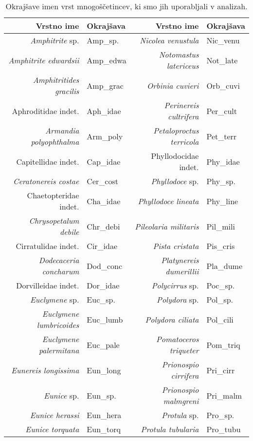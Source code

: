\begin{table}[htb]\footnotesize
\begin{center}
\caption[Okrajšav imen vrst mnogoščetincev]{Okrajšave imen vrst mnogoščetincev, ki smo jih uporabljali v analizah.}
\label{tab:okrasave:poly}
 \begin{tabular}{r l r l}
 \toprule
 Vrstno ime & Okrajšava & Vrstno ime & Okrajšava\\
 \midrule
\emph{Amphitrite} sp. & Amp\_sp. & \emph{Nicolea venustula} & Nic\_venu \\
\emph{Amphitrite edwardsii} & Amp\_edwa & \emph{Notomastus latericeus} & Not\_late \\
\emph{Amphitritides gracilis} & Amp\_grac & \emph{Orbinia cuvieri} & Orb\_cuvi \\
Aphroditidae indet. & Aph\_idae & \emph{Perinereis cultrifera} & Per\_cult \\
\emph{Armandia polyophthalma} & Arm\_poly & \emph{Petaloproctus terricola} & Pet\_terr \\
Capitellidae indet. & Cap\_idae & Phyllodocidae indet. & Phy\_idae \\
\emph{Ceratonereis costae} & Cer\_cost & \emph{Phyllodoce} sp. & Phy\_sp. \\
Chaetopteridae indet. & Cha\_idae & \emph{Phyllodoce lineata} & Phy\_line \\
\emph{Chrysopetalum debile} & Chr\_debi & \emph{Pileolaria militaris} & Pil\_mili \\
Cirratulidae indet. & Cir\_idae & \emph{Pista cristata} & Pis\_cris \\
\emph{Dodecaceria concharum} & Dod\_conc & \emph{Platynereis dumerillii} & Pla\_dume \\
Dorvilleidae indet. & Dor\_idae & \emph{Polycirrus} sp. & Poc\_sp. \\
\emph{Euclymene} sp. & Euc\_sp. & \emph{Polydora} sp. & Pol\_sp. \\
\emph{Euclymene lumbricoides} & Euc\_lumb & \emph{Polydora ciliata} & Pol\_cili \\
\emph{Euclymene palermitana} & Euc\_pale & \emph{Pomatoceros triqueter} & Pom\_triq \\
\emph{Eunereis longissima} & Eun\_long & \emph{Prionospio cirrifera} & Pri\_cirr \\
\emph{Eunice} sp. & Eun\_sp. & \emph{Prionospio malmgreni} & Pri\_malm \\
\emph{Eunice herassi} & Eun\_hera & \emph{Protula} sp. & Pro\_sp. \\
\emph{Eunice torquata} & Eun\_torq & \emph{Protula tubularia} & Pro\_tubu \\

\end{tabular}
\end{center}
\end{table}
